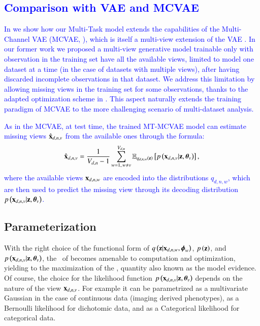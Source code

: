 \textcolor{blue}{
	\subsection{Comparison with VAE and MCVAE}
	In  we show how our Multi-Task model extends the capabilities of the Multi-Channel VAE (MCVAE, \cite{Antelmi2019}), which is itself a multi-view extension of the VAE \citep{Kingma2013,Rezende2014}.
	In our former work we proposed a multi-view generative model trainable only with observation in the training set have all the available views, limited to model one dataset at a time (in the case of datasets with multiple views), after having discarded incomplete observations in that dataset.
	We address this limitation by allowing missing views in the training set for some observations, thanks to the adapted optimization scheme in .
	This aspect naturally extends the training paradigm of MCVAE to the more challenging scenario of multi-dataset analysis.
	
	As in the MCVAE, at test time, the trained MT-MCVAE model can estimate missing views $\hat{\mathbf{x}}_{d,n,v}$ from the available ones through the formula:
	\begin{equation}\label{eq:reconstruction}
	\begin{aligned}
	\hat{\mathbf{x}}_{d,n,v} = \frac{1}{V_{d, n}-1} \sum_{w=1, \,w\neq v}^{V_{d, n}} \operatorname{\mathbb{E}}_{q_{d,n,w}(\mathbf{z})}\left[p\left(\mathbf{x}_{d,n,v}|\mathbf{z}, \boldsymbol{\theta}_v\right)\right],
	\end{aligned}
	\end{equation}
	where the available views $\mathbf{x}_{d,n,w}$ are encoded into the distributions $q_{d,n,w}$, which are then used to predict the missing view through its decoding distribution $p\left(\mathbf{x}_{d,n,v}|\mathbf{z}, \boldsymbol{\theta}_v\right)$.
}

\subsection{Parameterization}
\label{ssec:parameterization}

With the right choice of the functional form of $q\left(\mathbf{z}|\mathbf{x}_{d,n,w}, \boldsymbol{\phi}_w\right)$, $p\left(\mathbf{z}\right)$, and $p\left(\mathbf{x}_{d,n,v}|\mathbf{z}, \boldsymbol{\theta}_v\right)$, the \rhs\ of  becomes amenable to computation and optimization, yielding to the maximization of the \lhs, quantity also known as the model evidence.
Of course, the choice for the likelihood function $p\left(\mathbf{x}_{d,n,v}|\mathbf{z}, \boldsymbol{\theta}_v\right)$ depends on the nature of the view $\mathbf{x}_{d,n,v}$.
For example it can be parametrized as a multivariate Gaussian in the case of continuous data (\ie imaging derived phenotypes), as a Bernoulli likelihood for dichotomic data, and as a Categorical likelihood for categorical data.

